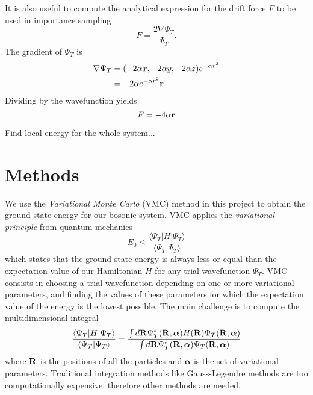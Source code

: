 \documentclass[english, a4paper]{article}
\begin{document}
\noindent It is also useful to compute the analytical expression for the drift force $F$ to be used in importance sampling
\begin{equation}
 F = \frac{2\nabla \Psi_T}{\Psi_T}.
\end{equation}
The gradient of $\Psi_T$ is
\begin{align}
 \nabla \Psi_T &= (-2\alpha x, -2\alpha y, -2\alpha z)e^{-\alpha r^2} \\
               &= -2\alpha e^{-\alpha r^2} \bf{r}
\end{align}
Dividing by the wavefunction yields
\begin{equation}
 F = -4\alpha \bf{r}
\end{equation}


Find local energy for the whole system...


\section*{Methods}

We use the \textit{Variational Monte Carlo} (VMC) method in this project to obtain the ground state energy
for our bosonic system. VMC applies the \textit{variational principle} from quantum mechanics
\begin{equation}
 E_0 \leq \frac{\langle \Psi_T | H | \Psi_T \rangle}{\langle \Psi_T | \Psi_T \rangle}
\end{equation}
which states that the ground state energy is always less or equal than the expectation value of our Hamiltonian $H$
for any trial wavefunction $\Psi_T$. VMC consists in choosing a trial wavefunction depending on one or more
variational parameters, and finding the values of these parameters for which the expectation value of the 
energy is the lowest possible. The main challenge is to compute the multidimensional integral
\begin{equation}
 \frac{\langle \Psi_T | H | \Psi_T \rangle}{\langle \Psi_T | \Psi_T \rangle} = 
 \frac{\int d {\bf R} \Psi_T^*({\bf R}, \boldsymbol{\alpha}) H({\bf R}) \Psi_T({\bf R}, \boldsymbol{\alpha})}
       {\int d {\bf R} \Psi_T^*({\bf R}, \boldsymbol{\alpha}) \Psi_T({\bf R}, \boldsymbol{\alpha})}
 \label{multidim}
\end{equation}
where $\bf{R}$ is the positions of all the particles and $\boldsymbol{\alpha}$ is the set of variational parameters.
Traditional integration methods like Gauss-Legendre methods are too computationally expensive, therefore 
other methods are needed.
\end{document}
